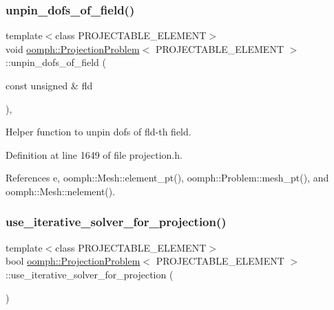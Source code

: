 \subsubsection{\texorpdfstring{unpin\+\_\+dofs\+\_\+of\+\_\+field()}{unpin\_dofs\_of\_field()}}
{\footnotesize\ttfamily template$<$class P\+R\+O\+J\+E\+C\+T\+A\+B\+L\+E\+\_\+\+E\+L\+E\+M\+E\+NT$>$ \\
void \hyperlink{classoomph_1_1ProjectionProblem}{oomph\+::\+Projection\+Problem}$<$ P\+R\+O\+J\+E\+C\+T\+A\+B\+L\+E\+\_\+\+E\+L\+E\+M\+E\+NT $>$\+::unpin\+\_\+dofs\+\_\+of\+\_\+field (\begin{DoxyParamCaption}\item[{const unsigned \&}]{fld }\end{DoxyParamCaption})\hspace{0.3cm}{\ttfamily [inline]}, {\ttfamily [private]}}



Helper function to unpin dofs of fld-\/th field. 



Definition at line 1649 of file projection.\+h.



References e, oomph\+::\+Mesh\+::element\+\_\+pt(), oomph\+::\+Problem\+::mesh\+\_\+pt(), and oomph\+::\+Mesh\+::nelement().

\mbox{\label{classoomph_1_1ProjectionProblem_a5652035eda34f398652ede076dc085ae}} 
\subsubsection{\texorpdfstring{use\+\_\+iterative\+\_\+solver\+\_\+for\+\_\+projection()}{use\_iterative\_solver\_for\_projection()}}
{\footnotesize\ttfamily template$<$class P\+R\+O\+J\+E\+C\+T\+A\+B\+L\+E\+\_\+\+E\+L\+E\+M\+E\+NT$>$ \\
bool \hyperlink{classoomph_1_1ProjectionProblem}{oomph\+::\+Projection\+Problem}$<$ P\+R\+O\+J\+E\+C\+T\+A\+B\+L\+E\+\_\+\+E\+L\+E\+M\+E\+NT $>$\+::use\+\_\+iterative\+\_\+solver\+\_\+for\+\_\+projection (\begin{DoxyParamCaption}{ }\end{DoxyParamCaption})\hspace{0.3cm}{\ttfamily [inline]}}

